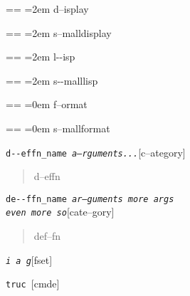 \documentclass{book}
\makeatletter
\newcommand\GNUTexinfocommandstyletextvar[1]{{\normalfont{}\textsl{#1}}}%
\newenvironment{GNUTexinfopreformatted}{%
  \par\obeylines\obeyspaces\frenchspacing
  \parskip=\z@\parindent=\z@}{}
\makeatother
\begin{document}
\begin{GNUTexinfopreformatted}
\leftskip=2em\relax%
d--isplay
\end{GNUTexinfopreformatted}

\begin{GNUTexinfopreformatted}
\leftskip=2em\relax\footnotesize%
s--malldisplay
\end{GNUTexinfopreformatted}

\begin{GNUTexinfopreformatted}
\leftskip=2em\relax\ttfamily%
l{-}{-}isp
\end{GNUTexinfopreformatted}

\begin{GNUTexinfopreformatted}
\leftskip=2em\relax\ttfamily\footnotesize%
s{-}{-}malllisp
\end{GNUTexinfopreformatted}

\begin{GNUTexinfopreformatted}
\leftskip=0em\relax%
f--ormat
\end{GNUTexinfopreformatted}

\begin{GNUTexinfopreformatted}
\leftskip=0em\relax\footnotesize%
s--mallformat
\end{GNUTexinfopreformatted}

\noindent\texttt{d{-}{-}effn\_name \EmbracOn{}\textnormal{\textsl{a--rguments...}}\EmbracOff{}}\hfill[c--ategory]



%
\begin{quote}
\unskip{\parskip=0pt\noindent}%
d--effn
\end{quote}

\noindent\texttt{de{-}{-}ffn\_name \EmbracOn{}\textnormal{\textsl{ar--guments    more args \leavevmode{}\\ even more so}}\EmbracOff{}}\hfill[cate--gory]



%
\begin{quote}
\unskip{\parskip=0pt\noindent}%
def--fn
\end{quote}

\noindent\texttt{\GNUTexinfocommandstyletextvar{i} \EmbracOn{}\textnormal{\textsl{a g}}\EmbracOff{}}\hfill[fset]



\index[fn]{i@\texttt{\GNUTexinfocommandstyletextvar{i}}}%
%
\noindent\texttt{truc \EmbracOn{}\textnormal{\textsl{}}\EmbracOff{}}\hfill[cmde]
\end{document}
